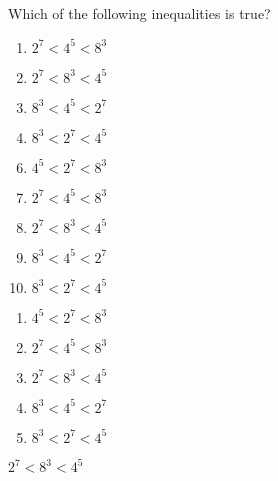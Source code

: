 

 Which of the following inequalities is true?


\ifsat
	\begin{enumerate}[label=\Alph*)]
		\item  $2^7<4^5<8^{3}$
		\item  $2^7<8^3<4^{5}$%
		\item  $8^3<4^5<2^{7}$
		\item  $8^3<2^7<4^{5}$
	\end{enumerate}
\else
\fi

\ifacteven
	\begin{enumerate}[label=\textbf{\Alph*.},itemsep=\fill,align=left]
		\setcounter{enumii}{5}
		\item  $4^5<2^7<8^{3}$
		\item  $2^7<4^5<8^{3}$
		\item  $2^7<8^3<4^{5}$%
		\addtocounter{enumii}{1}
		\item  $8^3<4^5<2^{7}$
		\item  $8^3<2^7<4^{5}$
	\end{enumerate}
\else
\fi

\ifactodd
	\begin{enumerate}[label=\textbf{\Alph*.},itemsep=\fill,align=left]
		\item  $4^5<2^7<8^{3}$
		\item  $2^7<4^5<8^{3}$
		\item  $2^7<8^3<4^{5}$%
		\item  $8^3<4^5<2^{7}$
		\item  $8^3<2^7<4^{5}$
	\end{enumerate}
\else
\fi

\ifgridin
  $2^7<8^3<4^{5}$%
		
\else
\fi

